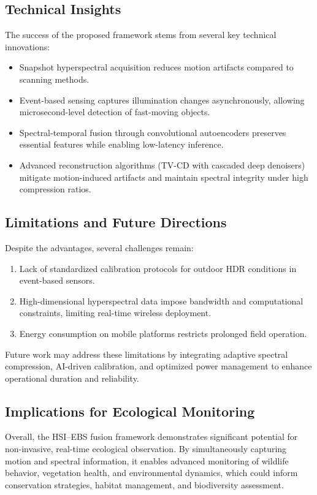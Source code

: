 \documentclass[conference]{IEEEtran}
\begin{document}
\subsection{Technical Insights}
The success of the proposed framework stems from several key technical innovations:  
\begin{itemize}
    \item Snapshot hyperspectral acquisition reduces motion artifacts compared to scanning methods.  
    \item Event-based sensing captures illumination changes asynchronously, allowing microsecond-level detection of fast-moving objects.  
    \item Spectral-temporal fusion through convolutional autoencoders preserves essential features while enabling low-latency inference.  
    \item Advanced reconstruction algorithms (TV-CD with cascaded deep denoisers) mitigate motion-induced artifacts and maintain spectral integrity under high compression ratios.
\end{itemize}

\subsection{Limitations and Future Directions}
Despite the advantages, several challenges remain:  
\begin{enumerate}
    \item Lack of standardized calibration protocols for outdoor HDR conditions in event-based sensors.  
    \item High-dimensional hyperspectral data impose bandwidth and computational constraints, limiting real-time wireless deployment.  
    \item Energy consumption on mobile platforms restricts prolonged field operation.  
\end{enumerate}

Future work may address these limitations by integrating adaptive spectral compression, AI-driven calibration, and optimized power management to enhance operational duration and reliability.

\subsection{Implications for Ecological Monitoring}
Overall, the HSI–EBS fusion framework demonstrates significant potential for non-invasive, real-time ecological observation. By simultaneously capturing motion and spectral information, it enables advanced monitoring of wildlife behavior, vegetation health, and environmental dynamics, which could inform conservation strategies, habitat management, and biodiversity assessment.
\end{document}
